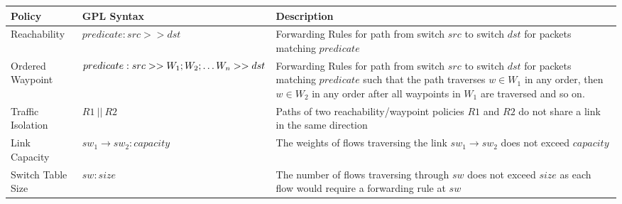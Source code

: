 \begin{table*}[thb!]
	\begin{center}
		\begin{tabular}{||m{6em} | m{12em} | m{28em} ||} 
			\hline
			Policy &  GPL Syntax & Description \\ 
			\hline\hline
			Reachability & 	$predicate : src >> dst$ & Forwarding Rules for path from switch $src$ to switch $dst$ for packets matching $predicate$ \\
			\hline
			Ordered Waypoint & $predicate :\newline src >> W_1;W_2; \ldots W_n >> dst$ & Forwarding Rules for path from switch $src$ to switch $dst$ for packets matching $predicate$ such that the path traverses $w \in W_1$ in any order, then $w \in W_2$ in any order after all waypoints in $W_1$ are traversed and so on.\\  
			\hline
			Traffic \newline Isolation & $R1 \ || \ R2$ & Paths of two reachability/waypoint policies $R1$ and $R2$ do not share a link in the same direction \\
			\hline
			Link \newline Capacity & $sw_1 \rightarrow sw_2 : capacity$  & The weights of flows traversing the link $sw_1 \rightarrow sw_2$ does not exceed $capacity$\\
			\hline
			Switch \newline Table Size & $sw : size$ & The number of flows traversing through $sw$ does not exceed $size$ as each flow would require a forwarding rule at $sw$ \\
			\hline\hline
		\end{tabular}
	\end{center}
	 \label{tab:policysupport} 
\end{table*}


